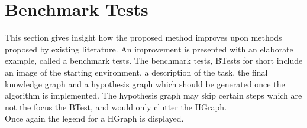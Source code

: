 
\section{Benchmark Tests}
\label{section: btests}
This section gives insight how the proposed method improves upon methods proposed by existing literature. An improvement is presented with an elaborate example, called a benchmark tests. The benchmark tests, BTests for short include an image of the starting environment, a description of the task, the final knowledge graph and a hypothesis graph which should be generated once the algorithm is implemented. The hypothesis graph may skip certain steps which are not the focus the BTest, and would only clutter the HGraph. \\

Once again the legend for a HGraph is displayed.\\


